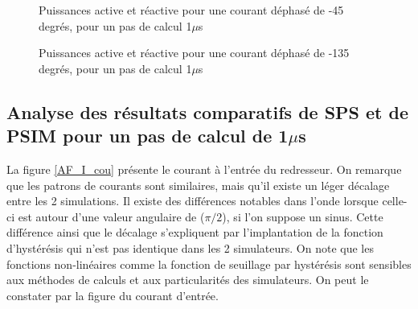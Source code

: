 \begin{figure}[htb]
\caption{Puissances active et réactive pour une courant déphasé de -45 degrés, pour un pas de calcul 1$\mu$s}
\label{AF_I_pui__45}
\end{figure}

\begin{figure}[htb]
\caption{Puissances active et réactive pour une courant déphasé de -135 degrés, pour un pas de calcul 1$\mu$s}
\label{AF_I_pui__135}
\end{figure}


\clearpage

\subsection{Analyse des résultats comparatifs de SPS et de PSIM pour un pas de calcul de 1$\mu$s}
La figure \ref{AF_I_cou} présente le courant à l'entrée du redresseur. On remarque que les patrons de courants sont similaires, mais qu'il existe un léger décalage entre les 2 simulations. Il existe des différences notables dans l'onde lorsque celle-ci est autour d'une valeur angulaire de ($\pi/2$), si l'on suppose un sinus. Cette différence ainsi que le décalage s'expliquent par l'implantation de la fonction d'hystérésis qui n'est pas identique dans les 2 simulateurs. On note que les fonctions non-linéaires comme la fonction de seuillage par hystérésis sont sensibles aux méthodes de calculs et aux particularités des simulateurs. On peut le constater par la figure du courant d'entrée.

